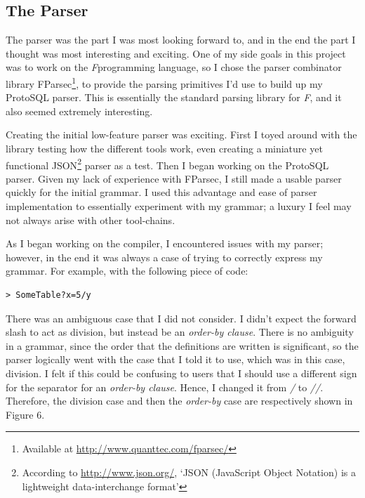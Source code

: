 \documentclass[titlepage]{article}
\newcommand{\FS}{\textit{F\nolinebreak\hspace{-.05em}\raisebox{.5ex}{\small\bf \#}}} %
\begin{document}
		\subsection{The Parser}

			The parser was the part I was most looking forward to, and in the end the part I thought was most interesting and exciting.  One of my side goals in this project was to work on the \FS programming language, so I chose the parser combinator library FParsec\footnote{Available at \url{http://www.quanttec.com/fparsec/}}, to provide the parsing primitives I'd use to build up my ProtoSQL parser.  This is essentially the standard parsing library for \FS, and it also seemed extremely interesting.

			Creating the initial low-feature parser was exciting.  First I toyed around with the library testing how the different tools work, even creating a miniature yet functional JSON\footnote{According to \url{http://www.json.org/}, `JSON (JavaScript Object Notation) is a lightweight data-interchange format'} parser as a test.  Then I began working on the ProtoSQL parser.  Given my lack of experience with FParsec, I still made a usable parser quickly for the initial grammar.  I used this advantage and ease of parser implementation to essentially experiment with my grammar; a luxury I feel may not always arise with other tool-chains.

			As I began working on the compiler, I encountered issues with my parser; however, in the end it was always a case of trying to correctly express my grammar.  For example, with the following piece of code:
			\newline

			\begin{lstlisting}[language=ProtoSQL]
				> SomeTable?x=5/y
			\end{lstlisting}

			There was an ambiguous case that I did not consider.  I didn't expect the forward slash to act as division, but instead be an \textit{order-by clause}.  There is no ambiguity in a grammar, since the order that the definitions are written is significant, so the parser logically went with the case that I told it to use, which was in this case, division.  I felt if this could be confusing to users that I should use a different sign for the separator for an \textit{order-by clause}.  Hence, I changed it from \textit{/} to \textit{//}.  Therefore, the division case and then the \textit{order-by} case are respectively shown in Figure 6.
			\newline
\end{document}
